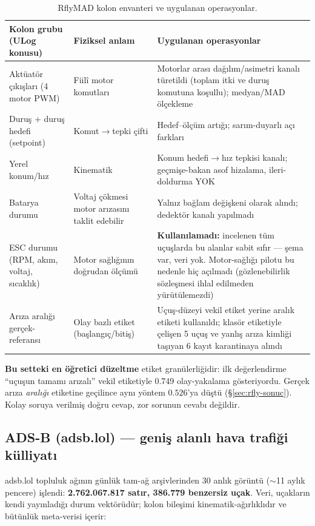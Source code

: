 \documentclass[11pt,a4paper]{article}
\begin{document}
\begin{table}[h]
\centering\small
\caption{RflyMAD kolon envanteri ve uygulanan operasyonlar.}
\label{tab:rfly-kolon}
\begin{tabular}{p{3.6cm}p{3.6cm}p{7cm}}
\toprule
Kolon grubu (ULog konusu) & Fiziksel anlam & Uygulanan operasyonlar \\
\midrule
Aktüatör çıkışları (4 motor PWM) & Fiilî motor komutları & Motorlar arası
dağılım/asimetri kanalı türetildi (toplam itki ve duruş komutuna koşullu);
medyan/MAD ölçekleme \\
\addlinespace[2pt]
Duruş + duruş hedefi (setpoint) & Komut$\to$tepki çifti & Hedef--ölçüm artığı;
sarım-duyarlı açı farkları \\
\addlinespace[2pt]
Yerel konum/hız & Kinematik & Konum hedefi$\to$hız tepkisi kanalı; geçmişe-bakan
asof hizalama, ileri-doldurma YOK \\
\addlinespace[2pt]
Batarya durumu & Voltaj çökmesi motor arızasını taklit edebilir & Yalnız bağlam
değişkeni olarak alındı; dedektör kanalı yapılmadı \\
\addlinespace[2pt]
ESC durumu (RPM, akım, voltaj, sıcaklık) & Motor sağlığının doğrudan ölçümü &
\textbf{Kullanılamadı:} incelenen tüm uçuşlarda bu alanlar sabit sıfır ---
şema var, veri yok. Motor-sağlığı pilotu bu nedenle hiç açılmadı (gözlenebilirlik
sözleşmesi ihlal edilmeden yürütülemezdi) \\
\addlinespace[2pt]
Arıza aralığı gerçek-referansı & Olay bazlı etiket (başlangıç/bitiş) & Uçuş-düzeyi
vekil etiket yerine aralık etiketi kullanıldı; klasör etiketiyle çelişen 5 uçuş
ve yanlış arıza kimliği taşıyan 6 kayıt karantinaya alındı \\
\bottomrule
\end{tabular}
\end{table}

\textbf{Bu setteki en öğretici düzeltme} etiket granülerliğidir: ilk değerlendirme
``uçuşun tamamı arızalı'' vekil etiketiyle 0.749 olay-yakalama gösteriyordu.
Gerçek arıza \emph{aralığı} etiketine geçilince aynı yöntem
$0.526$'ya düştü (\S\ref{sec:rfly-sonuc}). Kolay soruya verilmiş doğru cevap,
zor sorunun cevabı değildir.

\subsection{ADS-B (adsb.lol) --- geniş alanlı hava trafiği külliyatı}
\label{sec:adsb-veri}

adsb.lol \cite{adsblol} topluluk ağının günlük tam-ağ arşivlerinden 30 anlık
görüntü ($\sim$11 aylık pencere) işlendi: \textbf{2.762.067.817 satır, 386.779
benzersiz uçak}. Veri, uçakların kendi yayınladığı durum vektörüdür; kolon
bileşimi kinematik-ağırlıklıdır ve bütünlük meta-verisi içerir:
\end{document}
